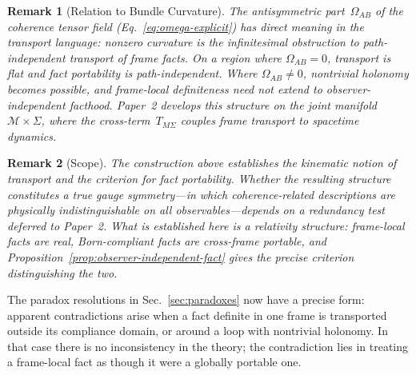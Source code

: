 \documentclass[aps,prd,twocolumn,superscriptaddress,nofootinbib,floatfix]{revtex4-2}
\newtheorem{remark}{Remark}
\newcommand{\Sig}{\Sigma}
\begin{document}
\begin{remark}[Relation to Bundle Curvature]
The antisymmetric part~$\Omega_{AB}$ of the coherence tensor field (Eq.~\eqref{eq:omega-explicit}) has direct meaning in the transport language: nonzero curvature is the infinitesimal obstruction to path-independent transport of frame facts. On a region where $\Omega_{AB} = 0$, transport is flat and fact portability is path-independent. Where $\Omega_{AB} \neq 0$, nontrivial holonomy becomes possible, and frame-local definiteness need not extend to observer-independent facthood. Paper~2 develops this structure on the joint manifold $\mathcal{M} \times \Sig$, where the cross-term~$T_{M\Sigma}$ couples frame transport to spacetime dynamics.
\end{remark}

\begin{remark}[Scope]
The construction above establishes the kinematic notion of transport and the criterion for fact portability. Whether the resulting structure constitutes a true gauge symmetry---in which coherence-related descriptions are physically indistinguishable on all observables---depends on a redundancy test deferred to Paper~2. What is established here is a \emph{relativity structure}: frame-local facts are real, Born-compliant facts are cross-frame portable, and Proposition~\ref{prop:observer-independent-fact} gives the precise criterion distinguishing the two.
\end{remark}

The paradox resolutions in Sec.~\ref{sec:paradoxes} now have a precise form: apparent contradictions arise when a fact definite in one frame is transported outside its compliance domain, or around a loop with nontrivial holonomy. In that case there is no inconsistency in the theory; the contradiction lies in treating a frame-local fact as though it were a globally portable one.
\end{document}
